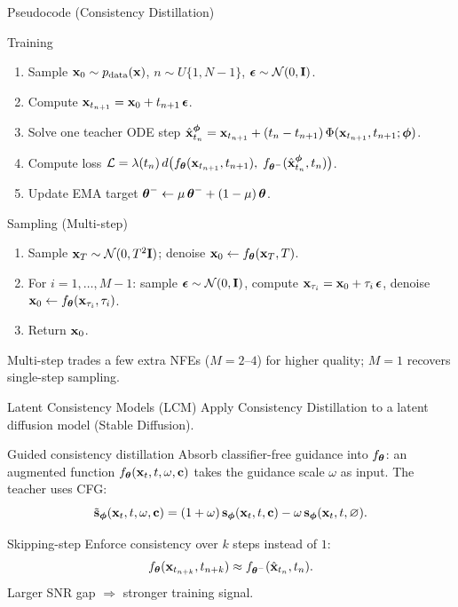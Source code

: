 \documentclass{beamer}
\renewcommand{\eqpause}{}
\begin{document}
\begin{frame}{Pseudocode (Consistency Distillation)}
	\begin{block}{Training}
		\begin{enumerate}
			\item Sample $\mathbf{x}_0 \sim p_{\text{data}}(\mathbf{x})$, $n \sim U\{1, N{-}1\}$, $\boldsymbol{\epsilon} \sim \mathcal{N}(0, \mathbf{I})$.
			\item Compute $\mathbf{x}_{t_{n+1}} = \mathbf{x}_0 + t_{n+1}\, \boldsymbol{\epsilon}$.
			\item Solve one teacher ODE step $\hat{\mathbf{x}}_{t_n}^{\boldsymbol{\phi}} = \mathbf{x}_{t_{n+1}} + (t_n - t_{n+1})\, \Phi(\mathbf{x}_{t_{n+1}}, t_{n+1}; \boldsymbol{\phi})$.
			\item Compute loss $\mathcal{L} = \lambda(t_n)\, d\bigl(f_{\boldsymbol{\theta}}(\mathbf{x}_{t_{n+1}}, t_{n+1}),\; f_{\boldsymbol{\theta}^-}(\hat{\mathbf{x}}_{t_n}^{\boldsymbol{\phi}}, t_n)\bigr)$.
			\item Update EMA target $\boldsymbol{\theta}^- \leftarrow \mu\, \boldsymbol{\theta}^- + (1 - \mu)\, \boldsymbol{\theta}$.
		\end{enumerate}
	\end{block}
	\eqpause
	\begin{block}{Sampling (Multi-step)}
		\begin{enumerate}
			\item Sample $\mathbf{x}_T \sim \mathcal{N}(0, T^2 \mathbf{I})$; denoise $\mathbf{x}_0 \leftarrow f_{\boldsymbol{\theta}}(\mathbf{x}_T, T)$.
			\item For $i = 1, \dots, M{-}1$: sample $\boldsymbol{\epsilon} \sim \mathcal{N}(0, \mathbf{I})$, compute $\mathbf{x}_{\tau_i} = \mathbf{x}_0 + \tau_i\, \boldsymbol{\epsilon}$, denoise $\mathbf{x}_0 \leftarrow f_{\boldsymbol{\theta}}(\mathbf{x}_{\tau_i}, \tau_i)$.
			\item Return $\mathbf{x}_0$.
		\end{enumerate}
	\end{block}
	\eqpause
	Multi-step trades a few extra NFEs ($M = 2$--$4$) for higher quality; $M = 1$ recovers single-step sampling.
\end{frame}
\begin{frame}{Latent Consistency Models (LCM)}
	Apply Consistency Distillation to a latent diffusion model (Stable Diffusion).
	\eqpause
	\begin{block}{Guided consistency distillation}
		Absorb classifier-free guidance into $f_{\boldsymbol{\theta}}$: an augmented function $f_{\boldsymbol{\theta}}(\mathbf{x}_t, t, \omega, \mathbf{c})$ takes the guidance scale $\omega$ as input. The teacher uses CFG:
		\vspace{-0.2cm}
		\[
			\tilde{\mathbf{s}}_{\boldsymbol{\phi}}(\mathbf{x}_t, t, \omega, \mathbf{c}) = (1 + \omega)\, \mathbf{s}_{\boldsymbol{\phi}}(\mathbf{x}_t, t, \mathbf{c}) - \omega\, \mathbf{s}_{\boldsymbol{\phi}}(\mathbf{x}_t, t, \varnothing).
		\]
	\end{block}
	\eqpause
	\begin{block}{Skipping-step}
		Enforce consistency over $k$ steps instead of $1$:
		\vspace{-0.2cm}
		\[
			f_{\boldsymbol{\theta}}(\mathbf{x}_{t_{n+k}}, t_{n+k}) \approx f_{\boldsymbol{\theta}^-}(\hat{\mathbf{x}}_{t_n}, t_n).
		\]
		Larger SNR gap $\Rightarrow$ stronger training signal.
	\end{block}
\end{frame}
\end{document}
